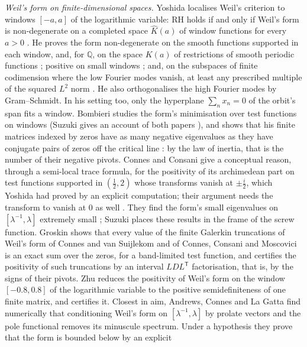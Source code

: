 \documentclass[11pt]{article}
\theoremstyle{definition}
\begin{document}
\emph{Weil's form on finite-dimensional spaces.} Yoshida \cite{yoshida92} localises Weil's criterion to windows
$[-a, a]$ of the logarithmic variable: RH holds if and only if Weil's form is non-degenerate on a completed space
$\hat K(a)$ of window functions for every $a > 0$ \cite[Theorem~2]{yoshida92}. He proves the form non-degenerate on the
smooth functions supported in each window, and, for $\mathbb Q$, on the space $K(a)$ of restrictions of smooth periodic
functions \cite[Propositions~2 and~7]{yoshida92}; positive on small windows \cite[Lemma~2]{yoshida92}; and, on the
subspaces of finite codimension where the low Fourier modes
vanish, at least any prescribed multiple of the squared $L^2$
norm \cite[Lemma~3]{yoshida92}. He also orthogonalises the high Fourier modes by Gram--Schmidt. In his setting too, only
the hyperplane $\sum_n x_n = 0$ of the orbit's span fits a window. Bombieri \cite{bombieri00, bombieri03} studies the
form's minimisation over test functions on windows (Suzuki gives an account of both papers \cite{suzuki26}), and
shows that his finite matrices indexed by zeros have as many negative eigenvalues as they have conjugate pairs of
zeros off the critical line \cite[Theorem~8]{bombieri00}: by the law of inertia, that is the number of their negative
pivots. Connes and Consani give a conceptual reason, through a semi-local trace formula, for the positivity of its
archimedean part on test functions supported in $(\frac12, 2)$ whose transforms vanish at $\pm\frac i2$, which Yoshida
had proved by an explicit computation; their argument needs the transform to vanish at $0$ as well
\cite{connes-consani21}. They find the form's small eigenvalues on $[\lambda^{-1}, \lambda]$ extremely small
\cite{connes-consani23}; Suzuki \cite{suzuki26} places these results in the frame of the screw function. Groskin
\cite{groskin26} shows that every value of the finite Galerkin truncations of Weil's form of Connes and van
Suijlekom \cite{connes-vansuijlekom25} and of Connes, Consani and Moscovici \cite{ccm25} is an exact sum over the
zeros, for a band-limited test function, and certifies the positivity of such truncations by an interval
$LDL^{\mathsf T}$ factorisation, that is, by the signs of their pivots. Zhu \cite{zhu26} reduces the positivity of
Weil's form on the window $[-0.8, 0.8]$ of the logarithmic variable to the positive semidefiniteness of one finite
matrix, and certifies it. Closest in aim, Andrews, Connes and La Gatta
\cite{acl26} find numerically that conditioning Weil's form on $[\lambda^{-1}, \lambda]$ by prolate vectors and the pole
functional removes its minuscule spectrum. Under a hypothesis they prove that the form is bounded below by an explicit
\end{document}
